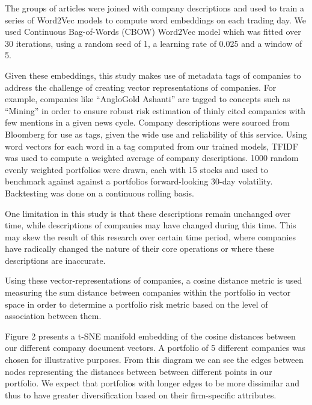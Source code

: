 \documentclass[11pt]{article}
\begin{document}
The groups of articles were joined with company descriptions and used to
train a series of Word2Vec models to compute word embeddings on each
trading day. We used Continuous Bag-of-Words (CBOW) Word2Vec model which
was fitted over 30 iterations, using a random seed of 1, a learning rate
of 0.025 and a window of 5.

Given these embeddings, this study makes use of metadata tags of
companies to address the challenge of creating vector representations of
companies. For example, companies like ``AngloGold Ashanti'' are tagged
to concepts such as ``Mining'' in order to ensure robust risk estimation
of thinly cited companies with few mentions in a given news cycle.
Company descriptions were sourced from Bloomberg for use as tags, given
the wide use and reliability of this service. Using word vectors for
each word in a tag computed from our trained models, TFIDF was used to
compute a weighted average of company descriptions. 1000 random evenly
weighted portfolios were drawn, each with 15 stocks and used to
benchmark against against a portfolios forward-looking 30-day
volatility. Backtesting was done on a continuous rolling basis.

One limitation in this study is that these descriptions remain unchanged
over time, while descriptions of companies may have changed during this
time. This may skew the result of this research over certain time
period, where companies have radically changed the nature of their core
operations or where these descriptions are inaccurate.

Using these vector-representations of companies, a cosine distance
metric is used measuring the sum distance between companies within the
portfolio in vector space in order to determine a portfolio risk metric
based on the level of association between them.

Figure 2 presents a t-SNE manifold embedding of the cosine distances
between our different company document vectors. A portfolio of 5
different companies was chosen for illustrative purposes. From this
diagram we can see the edges between nodes representing the distances
between between different points in our portfolio. We expect that
portfolios with longer edges to be more dissimilar and thus to have
greater diversification based on their firm-specific attributes.
\end{document}
